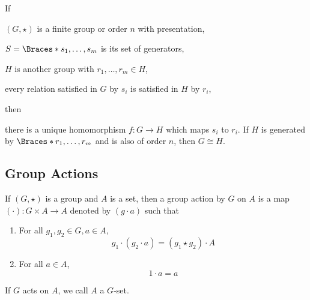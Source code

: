\documentclass[a5paper]{article}
\begin{document}
\begin{theorem}
  If
  \begin{premises}
    \item $(G,\star)$ is a finite group or order $n$ with presentation,
    \item $S=\braces{s_1,\ldots,s_m}$ is its set of generators,
    \item $H$ is another group with $r_1,\ldots,r_m\in H$,
    \item every relation satisfied in $G$ by $s_i$ is satisfied in $H$ by $r_i$,
  \end{premises}
  then
  \begin{conclusion}
    there is a unique homomorphism $f:G\to H$ which maps $s_i$ to $r_i$. If $H$
    is generated by $\braces{r_1,\ldots,r_m}$ and is also of order $n$, then
    $G\cong H$.
  \end{conclusion}
\end{theorem}

\subsection{Group Actions}

\begin{definition}
	If $(G,\star)$ is a group and $A$ is a set, then a group action by $G$ on $A$
  is a map $(\cdot):G\times A\to A$ denoted by $(g\cdot a)$ such that
  \begin{enumerate}%
    \item For all $g_1,g_2\in G,a\in A$,
    \begin{equation*}
      g_1\cdot(g_2\cdot a)=(g_1\star g_2)\cdot A
    \end{equation*}
    \item For all $a\in A$,
    \begin{equation*}
     1\cdot a=a
    \end{equation*}
  \end{enumerate}
  If $G$ acts on $A$, we call $A$ a $G$-set.
\end{definition}
\end{document}

